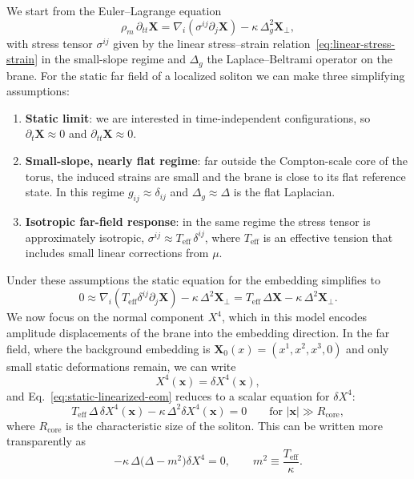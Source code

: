 We start from the Euler--Lagrange equation
\begin{equation}
  \rho_m\,\partial_{tt}\mathbf{X}
  = \nabla_i\!\left(\sigma^{ij}\partial_j\mathbf{X}\right)
  - \kappa\,\Delta_g^2\mathbf{X}_\perp,
  \label{eq:brane-eom-static-start}
\end{equation}
with stress tensor $\sigma^{ij}$ given by the linear stress--strain
relation~\eqref{eq:linear-stress-strain} in the small-slope regime and
$\Delta_g$ the Laplace--Beltrami operator on the brane. For the static
far field of a localized soliton we can make three simplifying
assumptions:

\begin{enumerate}
  \item \textbf{Static limit}: we are interested in time-independent
    configurations, so $\partial_t\mathbf X \approx 0$ and
    $\partial_{tt}\mathbf X \approx 0$.

  \item \textbf{Small-slope, nearly flat regime}: far outside the
    Compton-scale core of the torus, the induced strains are small and
    the brane is close to its flat reference state. In this regime
    $g_{ij} \approx \delta_{ij}$ and $\Delta_g \approx \Delta$ is the flat
    Laplacian.

  \item \textbf{Isotropic far-field response}: in the same regime the
    stress tensor is approximately isotropic,
    $\sigma^{ij} \approx T_{\mathrm{eff}}\,\delta^{ij}$, where
    $T_{\mathrm{eff}}$ is an effective tension that includes small linear
    corrections from $\mu$.
\end{enumerate}

Under these assumptions the static equation for the embedding simplifies
to
\begin{equation}
  0
  \approx
  \nabla_i\!\left(T_{\mathrm{eff}}\delta^{ij}\partial_j \mathbf X\right)
  - \kappa\,\Delta^2\mathbf X_\perp
  =
  T_{\mathrm{eff}}\,\Delta \mathbf X
  - \kappa\,\Delta^2\mathbf X_\perp.
  \label{eq:static-linearized-eom}
\end{equation}
We now focus on the normal component $X^4$, which in this model encodes
amplitude displacements of the brane into the embedding direction. In
the far field, where the background embedding is $\mathbf X_0(x) =
(x^1,x^2,x^3,0)$ and only small static deformations remain, we can write
\[
  X^4(\mathbf x) = \delta X^4(\mathbf x),
\]
and Eq.~\eqref{eq:static-linearized-eom} reduces to a scalar equation
for $\delta X^4$:
\begin{equation}
  T_{\mathrm{eff}}\,\Delta \,\delta X^4(\mathbf x)
  - \kappa\,\Delta^2 \delta X^4(\mathbf x)
  = 0
  \qquad\text{for } |\mathbf x| \gg R_{\mathrm{core}},
  \label{eq:biharmonic-X4}
\end{equation}
where $R_{\mathrm{core}}$ is the characteristic size of the soliton.
This can be written more transparently as
\begin{equation}
  -\kappa\,\Delta\bigl(\Delta - m^2\bigr)\delta X^4 = 0,
  \qquad
  m^2 \equiv \frac{T_\mathrm{eff}}{\kappa}.
  \label{eq:factorized-X4}
\end{equation}

